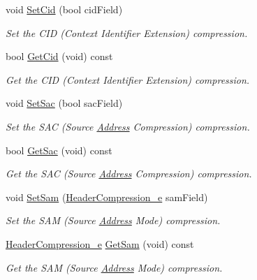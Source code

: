 \begin{DoxyCompactItemize}
void \hyperlink{classns3_1_1SixLowPanIphc_a75682e2991c0fdb6587e8d2bc79a5beb}{Set\+Cid} (bool cid\+Field)
\begin{DoxyCompactList}\small\item\em Set the C\+ID (Context Identifier Extension) compression. \end{DoxyCompactList}\item 
bool \hyperlink{classns3_1_1SixLowPanIphc_a952089a0945fc8a067c5016c3fe46126}{Get\+Cid} (void) const 
\begin{DoxyCompactList}\small\item\em Get the C\+ID (Context Identifier Extension) compression. \end{DoxyCompactList}\item 
void \hyperlink{classns3_1_1SixLowPanIphc_a9255e8785353902d7c88f6cf6b129577}{Set\+Sac} (bool sac\+Field)
\begin{DoxyCompactList}\small\item\em Set the S\+AC (Source \hyperlink{classns3_1_1Address}{Address} Compression) compression. \end{DoxyCompactList}\item 
bool \hyperlink{classns3_1_1SixLowPanIphc_ae88312e31d312221187b829d6976ce55}{Get\+Sac} (void) const 
\begin{DoxyCompactList}\small\item\em Get the S\+AC (Source \hyperlink{classns3_1_1Address}{Address} Compression) compression. \end{DoxyCompactList}\item 
void \hyperlink{classns3_1_1SixLowPanIphc_a2dda923b3bd6ed04869c0ad8c861aea8}{Set\+Sam} (\hyperlink{classns3_1_1SixLowPanIphc_a384e6b68c86e9d9a07c923dbc21a6843}{Header\+Compression\+\_\+e} sam\+Field)
\begin{DoxyCompactList}\small\item\em Set the S\+AM (Source \hyperlink{classns3_1_1Address}{Address} Mode) compression. \end{DoxyCompactList}\item 
\hyperlink{classns3_1_1SixLowPanIphc_a384e6b68c86e9d9a07c923dbc21a6843}{Header\+Compression\+\_\+e} \hyperlink{classns3_1_1SixLowPanIphc_a72874846ca511565a9895d1f4a5e2db0}{Get\+Sam} (void) const 
\begin{DoxyCompactList}\small\item\em Get the S\+AM (Source \hyperlink{classns3_1_1Address}{Address} Mode) compression. \end{DoxyCompactList}\item 

\end{DoxyCompactItemize}

